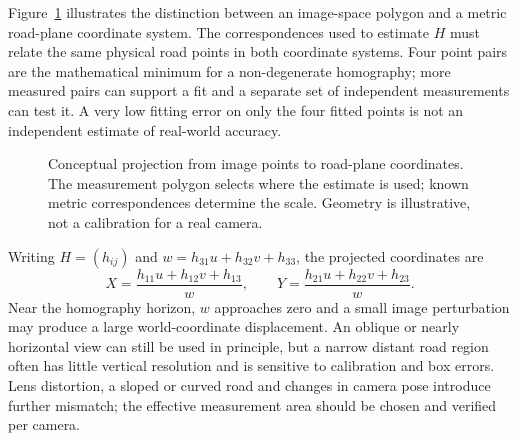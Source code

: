 Figure~\ref{fig:homography} illustrates the distinction between an image-space polygon and a metric road-plane coordinate system. The correspondences used to estimate $H$ must relate the same physical road points in both coordinate systems. Four point pairs are the mathematical minimum for a non-degenerate homography; more measured pairs can support a fit and a separate set of independent measurements can test it. A very low fitting error on only the four fitted points is not an independent estimate of real-world accuracy.

\begin{figure}[htbp]
\centering

\caption{Conceptual projection from image points to road-plane coordinates. The measurement polygon selects where the estimate is used; known metric correspondences determine the scale. Geometry is illustrative, not a calibration for a real camera.}
\label{fig:homography}
\end{figure}

Writing $H=(h_{ij})$ and $w=h_{31}u+h_{32}v+h_{33}$, the projected coordinates are
\begin{equation}
 X=\frac{h_{11}u+h_{12}v+h_{13}}{w},\qquad
 Y=\frac{h_{21}u+h_{22}v+h_{23}}{w}.
\end{equation}
Near the homography horizon, $w$ approaches zero and a small image perturbation may produce a large world-coordinate displacement. An oblique or nearly horizontal view can still be used in principle, but a narrow distant road region often has little vertical resolution and is sensitive to calibration and box errors. Lens distortion, a sloped or curved road and changes in camera pose introduce further mismatch; the effective measurement area should be chosen and verified per camera.

